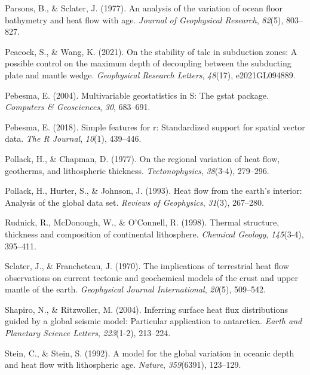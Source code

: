 \documentclass[draft,linenumbers]{agujournal2019}
\newlength{\cslhangindent}
\newenvironment{CSLReferences}[2]
 {\begin{list}{}{
  \setlength{\itemindent}{0pt}
  \setlength{\leftmargin}{0pt}
  \setlength{\parsep}{0pt}
  \ifodd #1
   \setlength{\leftmargin}{\cslhangindent}
   \setlength{\itemindent}{-\cslhangindent}
  \fi
  \setlength{\itemsep}{#2\baselineskip}
  }
  \item\relax}
 {\end{list}}
\begin{document}
\begin{CSLReferences}{1}{0}
Parsons, B., \& Sclater, J. (1977). An analysis of the variation of
ocean floor bathymetry and heat flow with age. \emph{Journal of
Geophysical Research}, \emph{82}(5), 803--827.

Peacock, S., \& Wang, K. (2021). On the stability of talc in subduction
zones: A possible control on the maximum depth of decoupling between the
subducting plate and mantle wedge. \emph{Geophysical Research Letters},
\emph{48}(17), e2021GL094889.

Pebesma, E. (2004). Multivariable geostatistics in {S}: The gstat
package. \emph{Computers \& Geosciences}, \emph{30}, 683--691.

Pebesma, E. (2018). Simple features for r: Standardized support for
spatial vector data. \emph{The R Journal}, \emph{10}(1), 439--446.

Pollack, H., \& Chapman, D. (1977). On the regional variation of heat
flow, geotherms, and lithospheric thickness. \emph{Tectonophysics},
\emph{38}(3-4), 279--296.

Pollack, H., Hurter, S., \& Johnson, J. (1993). Heat flow from the
earth's interior: Analysis of the global data set. \emph{Reviews of
Geophysics}, \emph{31}(3), 267--280.

Rudnick, R., McDonough, W., \& O'Connell, R. (1998). Thermal structure,
thickness and composition of continental lithosphere. \emph{Chemical
Geology}, \emph{145}(3-4), 395--411.

Sclater, J., \& Francheteau, J. (1970). The implications of terrestrial
heat flow observations on current tectonic and geochemical models of the
crust and upper mantle of the earth. \emph{Geophysical Journal
International}, \emph{20}(5), 509--542.

Shapiro, N., \& Ritzwoller, M. (2004). Inferring surface heat flux
distributions guided by a global seismic model: Particular application
to antarctica. \emph{Earth and Planetary Science Letters},
\emph{223}(1-2), 213--224.

Stein, C., \& Stein, S. (1992). A model for the global variation in
oceanic depth and heat flow with lithospheric age. \emph{Nature},
\emph{359}(6391), 123--129.


\end{CSLReferences}
\end{document}
